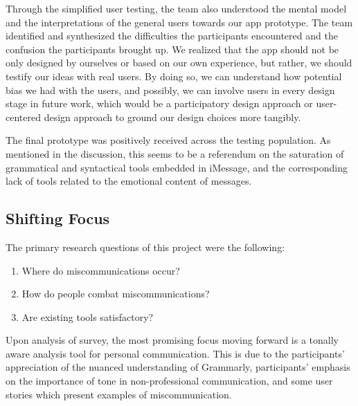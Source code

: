 \documentclass[acmsmall,screen,authorversion,nonacm]{acmart}
\begin{document}
Through the simplified user testing, the team also understood the mental model and the interpretations of the general users towards our app prototype. The team identified and synthesized the difficulties the participants encountered and the confusion the participants brought up. We realized that the app should not be only designed by ourselves or based on our own experience, but rather, we should testify our ideas with real users. By doing so, we can understand how potential bias we had with the users, and possibly, we can involve users in every design stage in future work, which would be a participatory design approach or user-centered design approach to ground our design choices more tangibly.

The final prototype was positively received across the testing population. As mentioned in the discussion, this seems to be a referendum on the saturation of grammatical and syntactical tools embedded in iMessage, and the corresponding lack of tools related to the emotional content of messages. 

\subsection{Shifting Focus}
The primary research questions of this project were the following:
\begin{enumerate}
  \item Where do miscommunications occur?
  \item How do people combat miscommunications?
  \item Are existing tools satisfactory?
\end{enumerate}


Upon analysis of survey, the most promising focus moving forward is a tonally aware analysis tool for personal communication. This is due to the participants' appreciation of the nuanced understanding of Grammarly, participants' emphasis on the importance of tone in non-professional communication, and some user stories which present examples of miscommunication.
\end{document}
